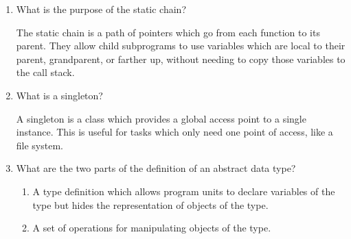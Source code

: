 \begin{enumerate}
  \item What is the purpose of the static chain?

  \begin{answer}

  	The static chain is a path of pointers which go from each function to its parent. They allow child subprograms to use variables which are local to their parent, grandparent, or farther up, without needing to copy those variables to the call stack.

  \end{answer}

  \item What is a singleton?

  \begin{answer}

  	A singleton is a class which provides a global access point to a single instance. This is useful for tasks which only need one point of access, like a file system.

  \end{answer}

  \item What are the two parts of the definition 
    of an abstract data type?

  \begin{answer}

  	\begin{enumerate}

  	  \item A type definition which allows program units to declare variables of the type but hides the representation of objects of the type.

  	  \item A set of operations for manipulating objects of the type.

  	\end{enumerate}

  \end{answer}

  \end{enumerate}


